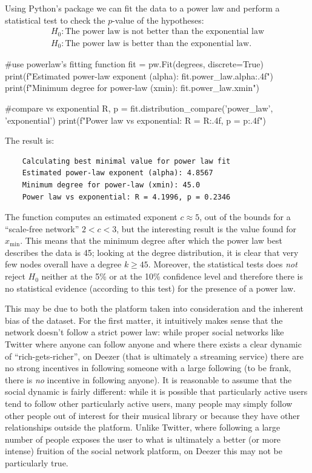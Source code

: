 \documentclass[12pt]{article}
\begin{document}
Using Python's package  we can fit the data to a power law and perform a statistical test to check the $p$-value of the hypotheses:
\begin{equation*}
	\begin{array}{l}
		H_{0}:\text{The power law is not better than the exponential law}\\
		 H_{0}:\text{The power law is better than the exponential law}.
	\end{array}
\end{equation*}
\begin{py}
	#use powerlaw's fitting function
	fit = pw.Fit(degrees, discrete=True)
	print(f"Estimated power-law exponent (alpha): {fit.power_law.alpha:.4f}")
	print(f"Minimum degree for power-law (xmin): {fit.power_law.xmin}")
	
	#compare vs exponential
	R, p = fit.distribution_compare('power_law', 'exponential')
	print(f"Power law vs exponential: R = {R:.4f}, p = {p:.4f}")
\end{py}
The result is:
\begin{center}
	\begin{verbatim}
	Calculating best minimal value for power law fit
	Estimated power-law exponent (alpha): 4.8567
	Minimum degree for power-law (xmin): 45.0
	Power law vs exponential: R = 4.1996, p = 0.2346
\end{verbatim}
\end{center}
The function computes an estimated exponent $c\approx 5$, out of the bounds for a ``scale-free network'' $2<c<3$, but the interesting result is the value found for $x_{\min}$. This means that the minimum degree after which the power law best describes the data is 45; looking at the degree distribution, it is clear that very few nodes overall have a degree $k\geq45$. Moreover, the statistical tests does \textit{not} reject $H_{0}$ neither at the 5\% or at the 10\% confidence level and therefore there is no statistical evidence (according to this test) for the presence of a power law.\par
This may be due to both the platform taken into consideration and the inherent bias of the dataset. For the first matter, it intuitively makes sense that the network doesn't follow a strict power law: while proper social networks like Twitter where anyone can follow anyone and where there exists a clear dynamic of ``rich-gets-richer'', on Deezer (that is ultimately a streaming service) there are no strong incentives in following someone with a large following (to be frank, there is \textit{no} incentive in following anyone). It is reasonable to assume that the social dynamic is fairly different: while it is possible that particularly active users tend to follow other particularly active users, many people may simply follow other people out of interest for their musical library or because they have other relationships outside the platform. Unlike Twitter, where following a large number of people exposes the user to what is ultimately a better (or more intense) fruition of the social network platform, on Deezer this may not be particularly true.\par
\end{document}
